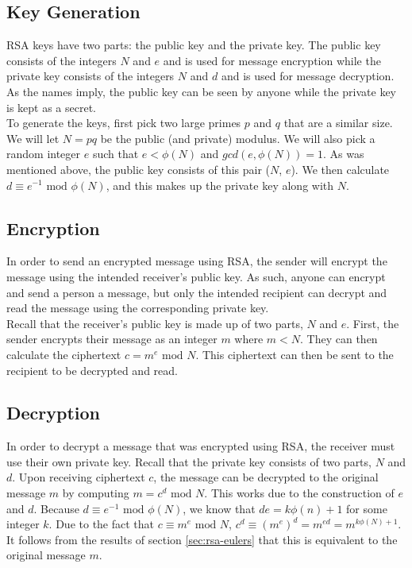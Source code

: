 	\subsection{Key Generation}\label{sec:rsa-keys}
		RSA keys have two parts: the public key and the private key. The public key consists of the integers $N$ and $e$ and is used for message encryption while the private key consists of the
		integers $N$ and $d$ and is used for message decryption. As the names imply, the public key can be seen by anyone while the private key is kept as a secret.\\

		To generate the keys, first pick two large primes $p$ and $q$ that are a similar size. We will let $N=pq$ be the public (and private) modulus. We will also pick a random integer $e$ such
		that $e<\phi(N)$ and $gcd(e,\phi(N))=1$. As was mentioned above, the public key consists of this pair ($N$, $e$). We then calculate $d\equiv e^{-1}\text{ mod }\phi(N)$, and this makes up
		the private key along with $N$.

	\subsection{Encryption}\label{sec:rsa-encryption}
		In order to send an encrypted message using RSA, the sender will encrypt the message using the intended receiver's public key. As such, anyone can encrypt and send a person a message,
		but only the intended recipient can decrypt and read the message using the corresponding private key.\\

		Recall that the receiver's public key is made up of two parts, $N$ and $e$. First, the sender encrypts their message as an integer $m$ where $m<N$. They can then calculate the ciphertext
		$c=m^e\text{ mod }N$. This ciphertext can then be sent to the recipient to be decrypted and read.

	\subsection{Decryption}\label{sec:rsa-decryption}
		In order to decrypt a message that was encrypted using RSA, the receiver must use their own private key. Recall that the private key consists of two parts, $N$ and $d$. Upon receiving
		ciphertext $c$, the message can be decrypted to the original message $m$ by computing $m=c^d\text{ mod }N$. This works due to the construction of $e$ and $d$. Because $d\equiv e^{-1}
		\text{ mod }\phi(N)$, we know that $de=k\phi(n)+1$ for some integer $k$. Due to the fact that $c\equiv m^e\text{ mod }N$, $c^d\equiv (m^e)^d=m^{ed}=m^{k\phi(N)+1}$. It follows from the
		results of section \ref{sec:rsa-eulers} that this is equivalent to the original message $m$.

